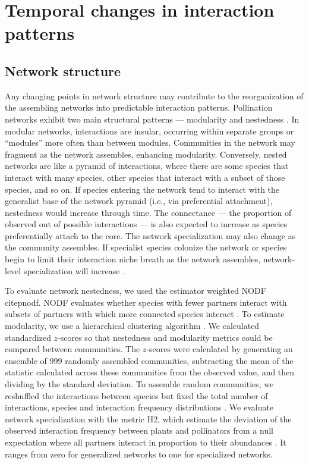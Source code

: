 \documentclass[12pt]{article}
\begin{document}
\section*{Temporal changes in interaction patterns}

\subsection*{Network structure}
Any changing points in network structure may contribute to the
reorganization of the assembling networks into predictable interaction
patterns. Pollination networks exhibit two main structural patterns
--- modularity \citep[e.g.,][]{Olesen2007} and nestedness
\citep[e.g.,][]{Bascompte2006, Bascompte2003}. In modular networks,
interactions are insular, occurring within separate groups or
``modules'' more often than between modules. Communities in the
network may fragment as the network assembles, enhancing
modularity. Conversely, nested networks are like a pyramid of
interactions, where there are some species that interact with many
species, other species that interact with a subset of those species,
and so on. If species entering the network tend to interact with the
generalist base of the network pyramid (i.e., via preferential
attachment), nestedness would increase through time. The connectance
--- the proportion of observed out of possible interactions --- is
also expected to increase as species preferentially attach to the
core. The network specialization may also change as the community
assembles. If specialist species colonize the network or species begin
to limit their interaction niche breath as the network assembles,
network-level specialization will increase \citep{bluthgen-2006-9}.

To evaluate network nestedness, we used the estimator weighted NODF
citep{nodf}. NODF evaluates whether species with fewer partners
interact with subsets of partners with which more connected species
interact \citep{nodf}. To estimate modularity, we use a hierarchical
clustering algorithm \citep{Newman2004, igraph}.  We calculated
standardized $z$-scores so that nestedness and modularity metrics
could be compared between communities. The $z$-scores were calculated
by generating an ensemble of $999$ randomly assembled communities,
subtracting the mean of the statistic calculated across these
communities from the observed value, and then dividing by the standard
deviation. To assemble random communities, we reshuffled the
interactions between species but fixed the total number of
interactions, species and interaction frequency distributions
\citep{Galeano2009}. We evaluate network specialization with the
metric H2, which estimate the deviation of the observed interaction
frequency between plants and pollinators from a null expectation where
all partners interact in proportion to their abundances
\citep{bluthgen-2006-9}. It ranges from zero for generalized networks
to one for specialized networks.
\end{document}
